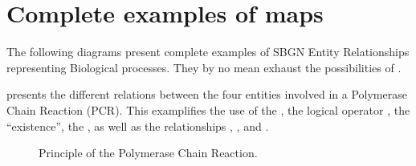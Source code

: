 \chapter{Complete examples of \SBGNERLone maps}

The following diagrams present complete examples of SBGN Entity Relationships representing Biological processes. They by no mean exhaust the possibilities of  \SBGNERLone.

 presents the different relations between the four entities involved in a Polymerase Chain Reaction (PCR). This examplifies the use of the , the logical operator , the  ``existence'', the , as well as the relationships , ,  and .

\begin{figure}[htb]
\begin{center}
\caption{Principle of the Polymerase Chain Reaction.}\label{fig:PCR}
\end{center}
\end{figure}

